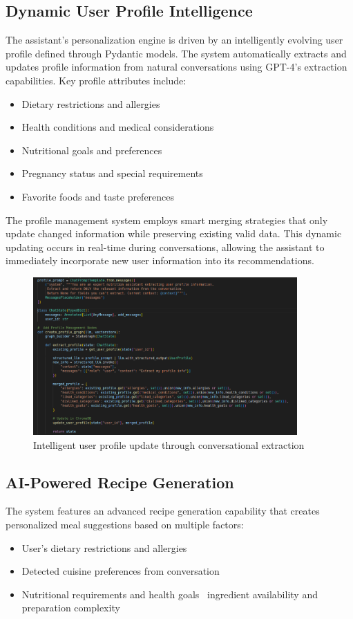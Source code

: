 \subsection{Dynamic User Profile Intelligence}
The assistant's personalization engine is driven by an intelligently evolving user profile defined through Pydantic models. The system automatically extracts and updates profile information from natural conversations using GPT-4's extraction capabilities. Key profile attributes include:
\begin{itemize}
\item Dietary restrictions and allergies
\item Health conditions and medical considerations
\item Nutritional goals and preferences
\item Pregnancy status and special requirements
\item Favorite foods and taste preferences
\end{itemize}

The profile management system employs smart merging strategies that only update changed information while preserving existing valid data. This dynamic updating occurs in real-time during conversations, allowing the assistant to immediately incorporate new user information into its recommendations.
\begin{center}
\begin{figure}[H]
\includegraphics[width=0.9\textwidth]{images/update_user_profile.png}
\caption{Intelligent user profile update through conversational extraction}
\label{fig:user update profile}
\end{figure}
\end{center}

\subsection{AI-Powered Recipe Generation}
The system features an advanced recipe generation capability that creates personalized meal suggestions based on multiple factors:
\begin{itemize}
\item User's dietary restrictions and allergies
\item Detected cuisine preferences from conversation
\item Nutritional requirements and health goals
\ ingredient availability and preparation complexity
\end{itemize}

